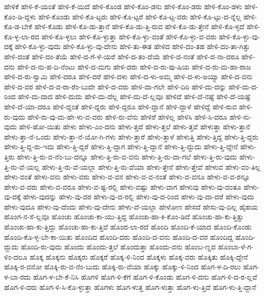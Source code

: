 {ಹೇಳಿಕೆ
ಹೇಳಿ-ಕೆ-ಯಂತೆ
ಹೇಳಿ-ಕೆ-ಯಿದೆ
ಹೇಳಿ-ಕೊಂಡ
ಹೇಳಿ-ಕೊಂ-ಡನು
ಹೇಳಿ-ಕೊಂ-ಡರು
ಹೇಳಿ-ಕೊಂ-ಡಳು
ಹೇಳಿ-ಕೊಂ-ಡಿ-ದ್ದಳು
ಹೇಳಿ-ಕೊಂಡು
ಹೇಳಿ-ಕೊ-ಟ್ಟರು
ಹೇಳಿ-ಕೊ-ಟ್ಟರೆ
ಹೇಳಿ-ಕೊ-ಟ್ಟ-ವರು
ಹೇಳಿ-ಕೊ-ಟ್ಟು-ದ-ನ್ನೆಲ್ಲ
ಹೇಳಿ-ಕೊ-ಡ-ಬೇಕೆ
ಹೇಳಿ-ಕೊಡು
ಹೇಳಿ-ಕೊ-ಡು-ತ್ತಾನೆ
ಹೇಳಿ-ಕೊ-ಡು-ತ್ತಿ-ರುವ
ಹೇಳಿ-ಕೊ-ಡು-ತ್ತೇನೆ
ಹೇಳಿ-ಕೊ-ಳ್ಳದೆ
ಹೇಳಿ-ಕೊ-ಳ್ಳ-ಲಾ-ರದ
ಹೇಳಿ-ಕೊ-ಳ್ಳಲು
ಹೇಳಿ-ಕೊ-ಳ್ಳುತ್ತಾ
ಹೇಳಿ-ಕೊ-ಳ್ಳು-ವಂತೆ
ಹೇಳಿ-ಕೊ-ಳ್ಳು-ವ-ವರು
ಹೇಳಿ-ಕೊ-ಳ್ಳು-ವು-ದಕ್ಕೆ
ಹೇಳಿ-ಕೊ-ಳ್ಳು-ವುದು
ಹೇಳಿ-ಕೊ-ಳ್ಳು-ವು-ದೇನು
ಹೇಳಿ-ತು-ಈತ
ಹೇಳಿದ
ಹೇಳಿ-ದಂ-ತಹ
ಹೇಳಿ-ದಂ-ತಾ-ಗಿತ್ತು
ಹೇಳಿ-ದಂತೆ
ಹೇಳಿ-ದಂ-ತೆಯೆ
ಹೇಳಿ-ದ-ಗೆ-ಳೆ-ಯರೆ
ಹೇಳಿ-ದ-ತಂ-ದೆಯೆ
ಹೇಳಿ-ದ-ನಂತೆ
ಹೇಳಿ-ದ-ನಾ-ದರೂ
ಹೇಳಿ-ದನು
ಹೇಳಿ-ದ-ನು-ಹ-ದಿ-ನೆಂಟು
ಹೇಳಿ-ದ-ಮಗು
ಹೇಳಿ-ದರು
ಹೇಳಿ-ದ-ರು-ಪು-ಷಿಯ
ಹೇಳಿ-ದ-ರು-ಮ-ಹಾ-ರಾಜ
ಹೇಳಿ-ದ-ರು-ಸ್ವಾಮಿ
ಹೇಳಿ-ದರೂ
ಹೇಳಿ-ದರೆ
ಹೇಳಿ-ದಳು
ಹೇಳಿ-ದ-ಳು-ಅಮ್ಮ
ಹೇಳಿ-ದ-ಳು-ಅಯ್ಯಾ
ಹೇಳಿ-ದ-ವನು
ಹೇಳಿ-ದ-ವರ
ಹೇಳಿ-ದ-ವ-ರಾ-ರೆಂ-ಬುದೇ
ಹೇಳಿ-ದ-ವರು
ಹೇಳಿ-ದಾ-ಗಲೇ
ಹೇಳಿ-ದಿರಿ
ಹೇಳಿ-ದು-ದನ್ನು
ಹೇಳಿ-ದು-ದ-ರಿಂದ
ಹೇಳಿ-ದು-ದಾದ
ಹೇಳಿ-ದುದು
ಹೇಳಿ-ದು-ದೆಲ್ಲ
ಹೇಳಿ-ದು-ದೆ-ಲ್ಲವೂ
ಹೇಳಿದೆ
ಹೇಳಿ-ದೆ-ನಷ್ಟೆ
ಹೇಳಿ-ದೆ-ಯಷ್ಟೆ
ಹೇಳಿ-ದೆ-ಯಾ-ದರೂ
ಹೇಳಿ-ದ್ದಂತೆ
ಹೇಳಿ-ದ್ದರು
ಹೇಳಿ-ದ್ದರೂ
ಹೇಳಿ-ದ್ದಾನೆ
ಹೇಳಿ-ದ್ದಾಳೆ
ಹೇಳಿದ್ದೆ
ಹೇಳಿ-ರುವ
ಹೇಳಿ-ರು-ವುದು
ಹೇಳಿ-ರು-ವು-ದು-ಹೇ-ಳು-ವ-ವರು
ಹೇಳಿ-ರು-ವೆನು
ಹೇಳಿರೆ
ಹೇಳಿಲ್ಲ
ಹೇಳಿಸಿ
ಹೇಳಿ-ಸಿ-ದರೂ
ಹೇಳಿ-ಸು-ವುದು
ಹೇಳಿ-ಹೋ-ಯಿತು
ಹೇಳು
ಹೇಳು-ಎಂ-ದನು
ಹೇಳು-ತ್ತದೆ
ಹೇಳು-ತ್ತಲೆ
ಹೇಳು-ತ್ತವೆ
ಹೇಳುತ್ತಾ
ಹೇಳು-ತ್ತಾನೆ
ಹೇಳು-ತ್ತಾ-ನೆ-ಒಂದು
ಹೇಳು-ತ್ತಾ-ನೆ-ಯೋ-ಗಿ-ಗಳು
ಹೇಳು-ತ್ತಾರೆ
ಹೇಳು-ತ್ತಾಳೆ
ಹೇಳುತ್ತಿ
ಹೇಳು-ತ್ತಿದ್ದ
ಹೇಳು-ತ್ತಿ-ದ್ದರು
ಹೇಳು-ತ್ತಿ-ದ್ದ-ರು-ಇದು
ಹೇಳು-ತ್ತಿ-ದ್ದರೆ
ಹೇಳು-ತ್ತಿ-ದ್ದಾಗ
ಹೇಳು-ತ್ತಿ-ದ್ದಾನೆ
ಹೇಳು-ತ್ತಿ-ದ್ದುದು
ಹೇಳು-ತ್ತಿ-ದ್ದೇನೆ
ಹೇಳು-ತ್ತಿರು
ಹೇಳು-ತ್ತಿ-ರು-ವ-ನೆಂ-ಬು-ದನ್ನೂ
ಹೇಳು-ತ್ತಿ-ರು-ವ-ವನು
ಹೇಳು-ತ್ತಿ-ರು-ವಾ-ಗಲೆ
ಹೇಳು-ತ್ತಿ-ರು-ವುದು
ಹೇಳು-ತ್ತಿ-ರು-ವೆ-ಯಲ್ಲ
ಹೇಳು-ತ್ತಿ-ರು-ವೆ-ಯಲ್ಲಾ
ಹೇಳು-ತ್ತಿ-ರು-ವೆಯಾ
ಹೇಳು-ತ್ತೇನೆ
ಹೇಳು-ತ್ತೇವೆ
ಹೇಳುವ
ಹೇಳು-ವಂ-ತಿಲ್ಲ
ಹೇಳು-ವಂತೆ
ಹೇಳು-ವನು
ಹೇಳು-ವರು
ಹೇಳು-ವ-ವನ
ಹೇಳು-ವ-ವ-ನಂತೆ
ಹೇಳು-ವ-ವನೂ
ಹೇಳು-ವ-ವ-ರನ್ನೂ
ಹೇಳು-ವ-ವರು
ಹೇಳು-ವ-ವರೂ
ಹೇಳು-ವ-ಷ್ಟ-ರಲ್ಲಿ
ಹೇಳು-ವಷ್ಟು
ಹೇಳು-ವಾಗ
ಹೇಳುವು
ಹೇಳು-ವು-ದಂತೂ
ಹೇಳು-ವು-ದಕ್ಕೆ
ಹೇಳು-ವುದನ್ನು
ಹೇಳು-ವು-ದರ
ಹೇಳು-ವು-ದ-ರಲ್ಲಿ
ಹೇಳು-ವು-ದ-ರಿಂದ
ಹೇಳು-ವು-ದಾ-ದರೆ
ಹೇಳು-ವುದು
ಹೇಳು-ವುದೂ
ಹೇಳು-ವು-ದೆಂದು
ಹೇಳು-ವು-ದೇನು
ಹೇಳು-ವೆ-ಯಲ್ಲಾ
ಹೇಳೋಣ
ಹೇಸದೆ
ಹೇಸು-ವು-ದಿಲ್ಲ
ಹೈಹಯ
ಹೊಂಗ-ನ-ಸೆ-ಲ್ಲವೂ
ಹೊಂಚು
ಹೊಂಚು-ಕಾ-ಯು-ತ್ತಿದ್ದ
ಹೊಂಚು-ಹಾ-ಕಿ-ಕೊಂ-ಡಿದೆ
ಹೊಂಚು-ಹಾ-ಕು-ತ್ತಿತ್ತು
ಹೊಂಚು-ಹಾ-ಕು-ತ್ತಿದ್ದು
ಹೊಂಚು-ಹಾ-ಕು-ತ್ತಿವೆ
ಹೊಂದ-ಲಾ-ರದೆ
ಹೊಂದಿ
ಹೊಂದಿ-ಕೆ-ಯಾದ
ಹೊಂದಿ-ಕೊಂಡು
ಹೊಂದಿ-ಕೊ-ಳ್ಳ-ಬೇ-ಕಾ-ಯಿತು
ಹೊಂದಿದ
ಹೊಂದಿ-ದರು
ಹೊಂದಿ-ದ-ವನು
ಹೊಂದಿ-ದ-ವರ
ಹೊಂದಿದ್ದ
ಹೊಂದಿ-ದ್ದುದು
ಹೊಂದಿ-ರು-ವುದು
ಹೊಂದು
ಹೊಂದು-ತ್ತಲೆ
ಹೊಂದುತ್ತಾ
ಹೊಂದು-ವನು
ಹೊಂಬ-ಣ್ಣದ
ಹೊಂಬಾ-ಳೆ-ಗ-ಳಿಂ-ದಲೂ
ಹೊಕ್ಕ
ಹೊಕ್ಕನು
ಹೊಕ್ಕರು
ಹೊಕ್ಕರೆ
ಹೊಕ್ಕ-ಳಿ-ನಿಂದ
ಹೊಕ್ಕಳು
ಹೊಕ್ಕ-ವರು
ಹೊಕ್ಕಿತು
ಹೊಕ್ಕಿ-ದ್ದೇನೆ
ಹೊಕ್ಕಿ-ರ-ವನೋ
ಹೊಕ್ಕಿ-ರು-ವ-ನೆಂ-ಬುದು
ಹೊಕ್ಕಿ-ರು-ವೆಯಾ
ಹೊಕ್ಕು
ಹೊಕ್ಕು-ಳಿ-ನಿಂದ
ಹೊಗ-ಳ-ದಿ-ರಲು
ಹೊಗ-ಳ-ಬಾ-ರದು
ಹೊಗ-ಳ-ಬೇ-ಕೆ-ನಿಸಿ
ಹೊಗಳಿ
ಹೊಗ-ಳಿ-ಕೆಗೆ
ಹೊಗ-ಳಿ-ಕೊಂಡು
ಹೊಗ-ಳಿ-ದನು
ಹೊಗ-ಳಿ-ದ-ರ-ಲ್ಲವೆ
ಹೊಗ-ಳಿ-ದರು
ಹೊಗ-ಳಿ-ಸಿ-ಕೊ-ಳ್ಳುತ್ತಾ
ಹೊಗಳು
ಹೊಗ-ಳುತ್ತ
ಹೊಗ-ಳುತ್ತಾ
ಹೊಗ-ಳು-ತ್ತಿದೆ
ಹೊಗ-ಳು-ತ್ತಿ-ದ್ದಾನೆ
}
